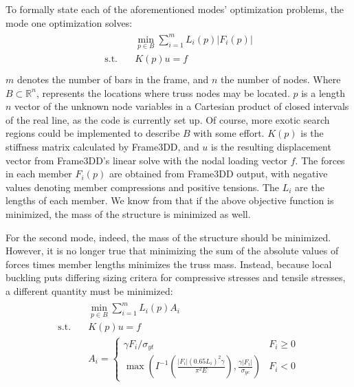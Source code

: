 \documentclass{article}
\begin{document}
To formally state each of the aforementioned modes' optimization problems, the mode one optimization solves:
\begin{align}
\begin{split}
  & \min_{p\in B} \sum_{i=1}^m L_i(p) |F_i(p)| \\
  \text{s.t.} \quad & K(p) u = f \\
\end{split}
\label{eq:mode1}
\end{align}
$m$ denotes the number of bars in the frame, and $n$ the number of nodes.
Where $B \subset \mathbb{R}^n$, represents the locations where truss nodes may be located. $p$ is a length $n$ vector of the unknown
node variables in a Cartesian product of closed intervals of the real line, as the code is currently set up.
Of course, more exotic search regions could be implemented to describe $B$ with some effort. $K(p)$ is
the stiffness matrix calculated by Frame3DD, and $u$ is the resulting displacement vector from Frame3DD's
linear solve with the nodal loading vector $f$. The forces in each member $F_i(p)$ are obtained from
Frame3DD output, with negative values denoting member compressions and positive tensions.
The $L_i$ are the lengths of each member.
We know from \cite{muellerComputationalExplorationStructural2014} that if the above
objective function is minimized, the mass of the structure is minimized as well.

For the second mode, indeed, the mass of the structure should be minimized. However, it
is no longer true that minimizing the sum of the absolute values of forces times member lengths
minimizes the truss mass. Instead, because local buckling puts differing sizing critera for
compressive stresses and tensile stresses, a different quantity must be minimized:
\begin{align}
\begin{split}
  & \min_{p\in B} \sum_{i=1}^m L_i(p) A_i \\
  \text{s.t.} \quad & K(p) u = f \\
                    & A_i = \begin{cases} \gamma F_i / \sigma_{yt} & F_i  \geq 0 \\
                      \max\left(I^{-1}\left(\frac{|F_i| (0.65 L_i)^2 \gamma}{\pi^2 E}\right), \frac{\gamma|F_i|}{\sigma_{yc}}\right) & F_i < 0
                    \end{cases}
\end{split}
\label{eq:mode2}
\end{align}
\end{document}
